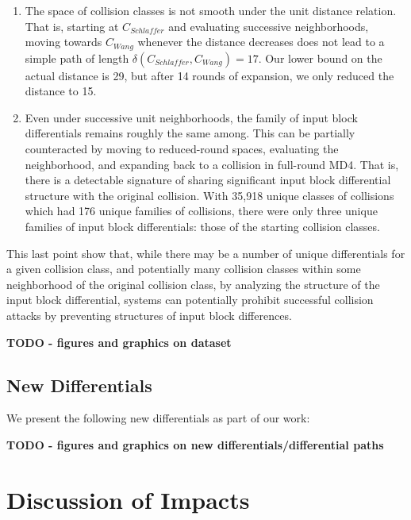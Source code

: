 \documentclass[conference]{IEEEtran}
\begin{document}
\begin{enumerate}
    \item The space of collision classes is not smooth under the unit distance
        relation. That is, starting at $C_{Schlaffer}$ and evaluating
        successive neighborhoods, moving towards $C_{Wang}$ whenever the
        distance decreases does not lead to a simple path of length
        $\delta(C_{Schlaffer}, C_{Wang}) = 17$. Our lower bound on the actual
        distance is 29, but after 14 rounds of expansion, we only reduced the
        distance to 15.
    \item Even under successive unit neighborhoods, the family of input block
        differentials remains roughly the same among. This can be partially
        counteracted by moving to reduced-round spaces, evaluating the
        neighborhood, and expanding back to a collision in full-round MD4.
        That is, there is a detectable signature of sharing significant
        input block differential structure with the original collision.
        With 35,918 unique classes of collisions which had 176 unique
        families of collisions, there were only three unique families of
        input block differentials: those of the starting collision classes.
\end{enumerate}

This last point show that, while there may be a number of unique differentials
for a given collision class, and potentially many collision classes within
some neighborhood of the original collision class, by analyzing the structure
of the input block differential, systems can potentially prohibit successful
collision attacks by preventing structures of input block differences.

\textbf{TODO - figures and graphics on dataset}




\subsection{New Differentials}

We present the following new differentials as part of our work:

\textbf{TODO - figures and graphics on new differentials/differential paths}






\section{Discussion of Impacts} \label{Sec:Impacts}
\end{document}
